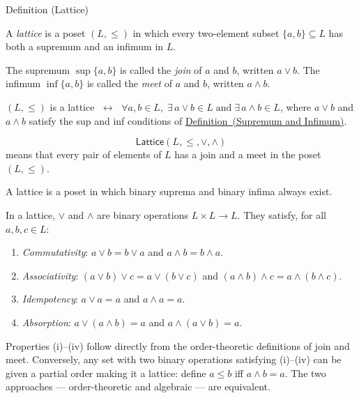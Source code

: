 
\begin{definitionbox}{Definition (Lattice)}
\begin{definition}[Lattice]\label{def:lattice}
A \emph{lattice} is a poset $(L, \leq)$ in which every two-element subset
$\{a, b\} \subseteq L$ has both a supremum and an infimum in $L$.

The supremum $\sup\{a,b\}$ is called the \emph{join} of $a$ and $b$,
written $a \vee b$.
The infimum $\inf\{a,b\}$ is called the \emph{meet} of $a$ and $b$,
written $a \wedge b$.
\end{definition}
\end{definitionbox}
\begin{remark*}
$(L, \leq)$ is a lattice $\;\leftrightarrow\;$
$\forall a, b \in L,\;\exists\, a \vee b \in L \;\text{and}\; \exists\, a \wedge b \in L$,
where $a \vee b$ and $a \wedge b$ satisfy the sup and inf conditions of
\hyperref[def:sup-inf]{Definition~(Supremum and Infimum)}.
\end{remark*}

\begin{remark*}
\[
  \mathsf{Lattice}(L,\leq,\vee,\wedge)
\] means that every pair of elements of
$L$ has a join and a meet in the poset $(L,\leq)$.
\end{remark*}

\begin{remark*}[Interpretation]
A lattice is a poset in which binary suprema and binary infima always exist.
\end{remark*}

\begin{remark*}[Exposition]
In a lattice, $\vee$ and $\wedge$ are binary operations $L \times L \to L$.
They satisfy, for all $a, b, c \in L$:
\begin{enumerate}[label=(\roman*)]
  \item \emph{Commutativity}: $a \vee b = b \vee a$ and $a \wedge b = b \wedge a$.
  \item \emph{Associativity}: $(a \vee b) \vee c = a \vee (b \vee c)$ and
        $(a \wedge b) \wedge c = a \wedge (b \wedge c)$.
  \item \emph{Idempotency}: $a \vee a = a$ and $a \wedge a = a$.
  \item \emph{Absorption}: $a \vee (a \wedge b) = a$ and
        $a \wedge (a \vee b) = a$.
\end{enumerate}
Properties (i)--(iv) follow directly from the order-theoretic definitions of join
and meet.  Conversely, any set with two binary operations satisfying (i)--(iv)
can be given a partial order making it a lattice: define $a \leq b$ iff
$a \wedge b = a$.  The two approaches --- order-theoretic and algebraic --- are
equivalent.
\end{remark*}

